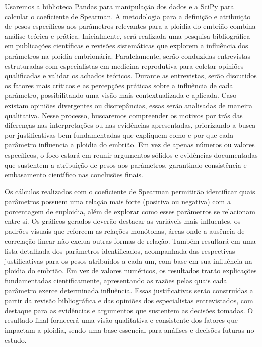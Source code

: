 Usaremos a biblioteca Pandas para manipulação dos dados e a SciPy para calcular o coeficiente de Spearman. A metodologia para a definição e atribuição de pesos específicos aos parâmetros relevantes para a ploidia do embrião combina análise teórica e prática. Inicialmente, será realizada uma pesquisa bibliográfica em publicações científicas e revisões sistemáticas que explorem a influência dos parâmetros na ploidia embrionária. Paralelamente, serão conduzidas entrevistas estruturadas com especialistas em medicina reprodutiva para coletar opiniões qualificadas e validar os achados teóricos. Durante as entrevistas, serão discutidos os fatores mais críticos e as percepções práticas sobre a influência de cada parâmetro, possibilitando uma visão mais contextualizada e aplicada. Caso existam opiniões divergentes ou discrepâncias, essas serão analisadas de maneira qualitativa. Nesse processo, buscaremos compreender os motivos por trás das diferenças nas interpretações ou nas evidências apresentadas, priorizando a busca por justificativas bem fundamentadas que expliquem como e por que cada parâmetro influencia a ploidia do embrião. Em vez de apenas números ou valores específicos, o foco estará em reunir argumentos sólidos e evidências documentadas que sustentem a atribuição de pesos aos parâmetros, garantindo consistência e embasamento científico nas conclusões finais.

Os cálculos realizados com o coeficiente de Spearman permitirão identificar quais parâmetros possuem uma relação mais forte (positiva ou negativa) com a porcentagem de euploidia, além de explorar como esses parâmetros se relacionam entre si. Os gráficos gerados deverão destacar as variáveis mais influentes, os padrões visuais que reforcem as relações monótonas, áreas onde a ausência de correlação linear não exclua outras formas de relação. Também resultará em uma lista detalhada dos parâmetros identificados, acompanhada das respectivas justificativas para os pesos atribuídos a cada um, com base em sua influência na ploidia do embrião. Em vez de valores numéricos, os resultados trarão explicações fundamentadas cientificamente, apresentando as razões pelas quais cada parâmetro exerce determinada influência. Essas justificativas serão construídas a partir da revisão bibliográfica e das opiniões dos especialistas entrevistados, com destaque para as evidências e argumentos que sustentem as decisões tomadas. O resultado final fornecerá uma visão qualitativa e consistente dos fatores que impactam a ploidia, sendo uma base essencial para análises e decisões futuras no estudo.

